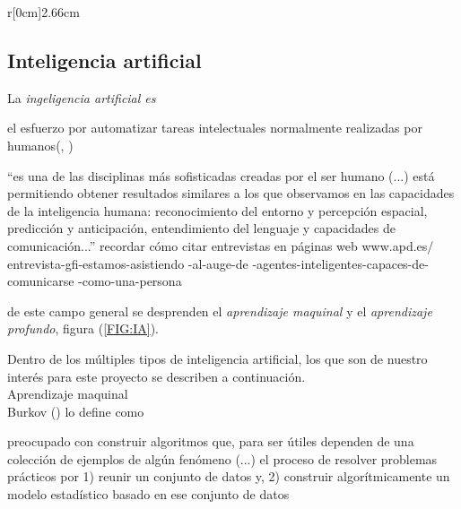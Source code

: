 \begin{wrapfigure}[9]{r}[0cm]{2.66cm}
	\caption[Inteligencia artificial]{\\Inteligencia\\artificial}\label{FIG:IA}
\end{wrapfigure}\subsection {Inteligencia artificial}\label{subsec:intela}
La \emph{ingeligencia artificial es}
\begin{displayquote}
el esfuerzo por automatizar tareas intelectuales normalmente realizadas por humanos(\citeauthor{cho18}, \citeyear{cho18})
\end{displayquote}
\begin{displayquote}
``es una de las disciplinas más sofisticadas creadas por el ser humano (...) está permitiendo obtener resultados similares a los que observamos en las capacidades de la inteligencia humana: reconocimiento del entorno y percepción espacial, predicción y anticipación, entendimiento del lenguaje y capacidades de comunicación...'' recordar cómo citar entrevistas en páginas web www.apd.es/ entrevista-gfi-estamos-asistiendo -al-auge-de -agentes-inteligentes-capaces-de-comunicarse -como-una-persona\end{displayquote}
de este campo general se desprenden el \emph{aprendizaje maquinal} y el \emph{aprendizaje profundo}, figura (\ref{FIG:IA}).

Dentro de los múltiples tipos de inteligencia artificial, los que son de nuestro interés para este proyecto se describen a continuación.\\

Aprendizaje maquinal\\
Burkov (\citeyear{burk19}) lo define como
\begin{displayquote}
preocupado con construir algoritmos que, para ser útiles dependen de una colección de ejemplos de algún fenómeno (...) el proceso de resolver problemas prácticos por 1) reunir un conjunto de datos y, 2) construir algorítmicamente un modelo estadístico basado en ese conjunto de datos
\end{displayquote}

